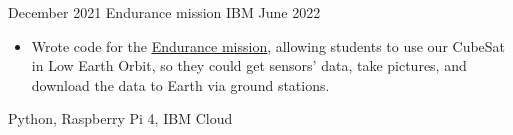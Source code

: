 %
%
%


\begin{projects}

    \project
        {December 2021}
        {Endurance mission}
        {IBM}
        {June 2022}
        {
            \begin{itemize}
                \item Wrote code for the \href{https://www.ibm.com/blog/cubesat-space-mission-endurance-democratizing-access-to-space/}{\underline{Endurance mission}},
                      allowing students to use our CubeSat in Low Earth Orbit, so they could
                      get sensors' data, take pictures, and download the data to Earth via ground stations.
            \end{itemize}
        }
        {
            Python,
            Raspberry Pi 4,
            IBM Cloud
        }
    
    \emptySeparator




\end{projects}
